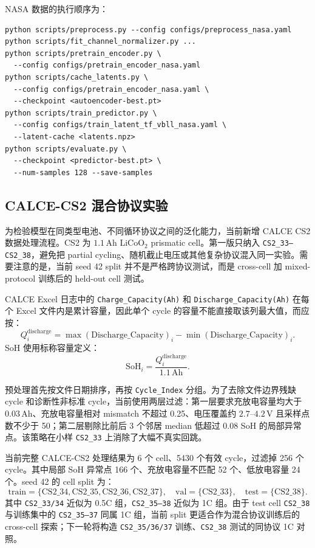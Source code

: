 \documentclass[11pt,a4paper,fontset=none]{ctexart}
\begin{document}
NASA 数据的执行顺序为：
\begin{verbatim}
python scripts/preprocess.py --config configs/preprocess_nasa.yaml
python scripts/fit_channel_normalizer.py ...
python scripts/pretrain_encoder.py \
  --config configs/pretrain_encoder_nasa.yaml
python scripts/cache_latents.py \
  --config configs/pretrain_encoder_nasa.yaml \
  --checkpoint <autoencoder-best.pt>
python scripts/train_predictor.py \
  --config configs/train_latent_tf_vbll_nasa.yaml \
  --latent-cache <latents.npz>
python scripts/evaluate.py \
  --checkpoint <predictor-best.pt> \
  --num-samples 128 --save-samples
\end{verbatim}

\subsection{CALCE-CS2 混合协议实验}

为检验模型在同类型电池、不同循环协议之间的泛化能力，当前新增 CALCE CS2 数据处理流程。CS2 为 $1.1\,\mathrm{Ah}$ LiCoO$_2$ prismatic cell。第一版只纳入 \texttt{CS2\_33--CS2\_38}，避免把 partial cycling、随机截止电压或其他复杂协议混入同一实验。需要注意的是，当前 seed 42 split 并不是严格跨协议测试，而是 cross-cell 加 mixed-protocol 训练后的 held-out cell 测试。

CALCE Excel 日志中的 \texttt{Charge\_Capacity(Ah)} 和 \texttt{Discharge\_Capacity(Ah)} 在每个 Excel 文件内是累计容量，因此单个 cycle 的容量不能直接取该列最大值，而应按：
\[
Q^{\mathrm{discharge}}_i
=
\max(\mathrm{Discharge\_Capacity})_i
-
\min(\mathrm{Discharge\_Capacity})_i.
\]
SoH 使用标称容量定义：
\[
\mathrm{SoH}_i=\frac{Q^{\mathrm{discharge}}_i}{1.1\,\mathrm{Ah}}.
\]

预处理首先按文件日期排序，再按 \texttt{Cycle\_Index} 分组。为了去除文件边界残缺 cycle 和诊断性非标准 cycle，当前使用两层过滤：第一层要求充放电容量均大于 $0.03\,\mathrm{Ah}$、充放电容量相对 mismatch 不超过 0.25、电压覆盖约 $2.7$--$4.2\,\mathrm{V}$ 且采样点数不少于 50；第二层剔除比前后 3 个邻居 median 低超过 0.08 SoH 的局部异常点。该策略在小样 \texttt{CS2\_33} 上消除了大幅不真实回跳。

当前完整 CALCE-CS2 处理结果为 6 个 cell、5430 个有效 cycle，过滤掉 256 个 cycle。其中局部 SoH 异常点 166 个、充放电容量不匹配 52 个、低放电容量 24 个。seed 42 的 cell split 为：
\[
\mathrm{train}=\{\mathrm{CS2\_34,CS2\_35,CS2\_36,CS2\_37}\},\quad
\mathrm{val}=\{\mathrm{CS2\_33}\},\quad
\mathrm{test}=\{\mathrm{CS2\_38}\}.
\]
其中 \texttt{CS2\_33/34} 近似为 0.5C 组，\texttt{CS2\_35--38} 近似为 1C 组。由于 test cell \texttt{CS2\_38} 与训练集中的 \texttt{CS2\_35--37} 同属 1C 组，当前 split 更适合作为混合协议训练后的 cross-cell 探索；下一轮将构造 \texttt{CS2\_35/36/37} 训练、\texttt{CS2\_38} 测试的同协议 1C 对照。
\end{document}
